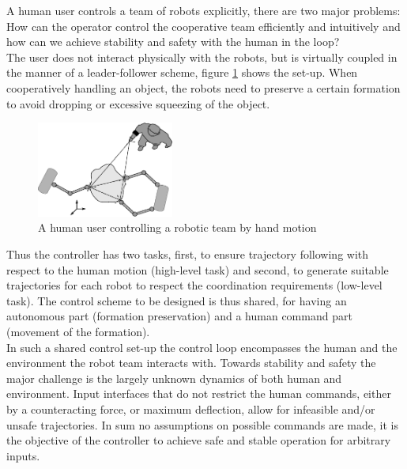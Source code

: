 \documentclass[a4paper,twoside, openright,12pt]{report}
\begin{document}
A human user controls a team of robots explicitly, there are two major problems: How can the operator control the cooperative team efficiently and intuitively and how can we achieve stability and safety with the human in the loop?\\
The user does not interact physically with the robots, but is virtually coupled in the manner of a leader-follower scheme, figure \ref{FIG:ProblemOverview} shows the set-up. When cooperatively handling an object, the robots need to preserve a certain formation to avoid dropping or excessive squeezing of the object.
\begin{figure}[b]
			\centering
			\includegraphics[width=0.4\textwidth]{general_setup.eps}
			\caption{A human user controlling a robotic team by hand motion}
			\label{FIG:ProblemOverview}

\end{figure}
 Thus the controller has two tasks, first, to ensure trajectory following with respect to the human motion (high-level task) and second, to generate suitable trajectories for each robot to respect the coordination requirements (low-level task). The control scheme to be designed is thus shared, for having an autonomous part (formation preservation) and a human command part (movement of the formation).\\
 
In such a shared control set-up the control loop encompasses the human and the environment the robot team interacts with. 
Towards stability and safety the major challenge is the largely unknown dynamics of both human and environment.
Input interfaces that do not restrict the human commands, either by a counteracting force, or maximum deflection, allow for infeasible and/or unsafe trajectories. In sum no assumptions on possible commands are made, it is the objective of the controller to achieve safe and stable operation for arbitrary inputs.
\end{document}
